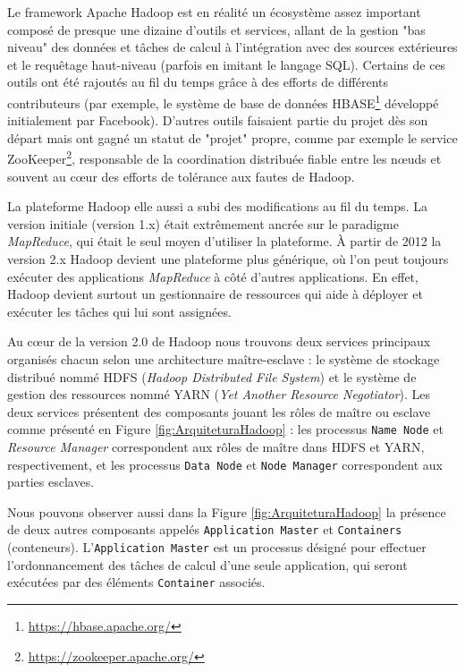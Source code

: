 Le framework Apache Hadoop est en réalité un écosystème assez important composé de presque une dizaine d'outils et services, allant de la gestion "bas niveau" des données et tâches de calcul à l'intégration avec des sources extérieures et le requêtage haut-niveau (parfois en imitant le langage SQL). Certains de ces outils ont été rajoutés au fil du temps grâce à des efforts de différents contributeurs (par exemple, le système de base de données HBASE\footnote{\url{https://hbase.apache.org/}} développé initialement par Facebook). D'autres outils faisaient partie du projet dès son départ mais ont gagné un statut de "projet" propre, comme par exemple le service ZooKeeper\footnote{\url{https://zookeeper.apache.org/}}, responsable de la coordination distribuée fiable entre les n{\oe}uds et souvent au c{\oe}ur des efforts de tolérance aux fautes de Hadoop.

La plateforme Hadoop elle aussi a subi des modifications au fil du temps. La version initiale (version 1.x) était extrêmement ancrée sur le paradigme \textit{MapReduce}, qui était le seul moyen d'utiliser la plateforme. À partir de 2012 la version 2.x Hadoop devient une plateforme plus générique, où l'on peut toujours exécuter des applications \textit{MapReduce} à côté d'autres applications. En effet, Hadoop devient surtout un gestionnaire de ressources qui aide à déployer et exécuter les tâches qui lui sont assignées.  

Au c{\oe}ur de la version 2.0 de Hadoop nous trouvons deux services principaux organisés chacun selon une architecture maître-esclave : le système de stockage distribué nommé HDFS (\textit{Hadoop Distributed File System}) et le système de gestion des ressources nommé YARN (\textit{Yet Another Resource Negotiator}). Les deux services présentent des composants jouant les rôles de maître ou esclave comme présenté en Figure \ref{fig:ArquiteturaHadoop} : les processus \texttt{Name Node} et \textit{Resource Manager} correspondent aux rôles de maître dans HDFS et YARN, respectivement, et les processus \texttt{Data Node} et \texttt{Node Manager} correspondent aux parties esclaves. 

Nous pouvons observer aussi dans la Figure \ref{fig:ArquiteturaHadoop} la présence de deux autres composants appelés \texttt{Application Master} et \texttt{Containers} (conteneurs). L'\texttt{Application Master} est un processus désigné pour effectuer l'ordonnancement des tâches de calcul d'une seule application, qui seront exécutées par des éléments \texttt{Container} associés.  

